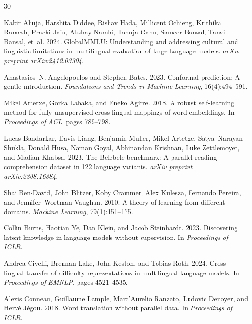 \documentclass[11pt,a4paper]{article}
\begin{document}
\begin{thebibliography}{30}

Kabir Ahuja, Harshita Diddee, Rishav Hada, Millicent Ochieng, Krithika Ramesh, Prachi Jain, Akshay Nambi, Tanuja Ganu, Sameer Bansal, Tanvi Bansal, et~al. 2024.
\newblock Global{MMLU}: Understanding and addressing cultural and linguistic limitations in multilingual evaluation of large language models.
\newblock \emph{arXiv preprint arXiv:2412.03304}.

Anastasios~N. Angelopoulos and Stephen Bates. 2023.
\newblock Conformal prediction: A gentle introduction.
\newblock \emph{Foundations and Trends in Machine Learning}, 16(4):494--591.

Mikel Artetxe, Gorka Labaka, and Eneko Agirre. 2018.
\newblock A robust self-learning method for fully unsupervised cross-lingual mappings of word embeddings.
\newblock In \emph{Proceedings of ACL}, pages 789--798.

Lucas Bandarkar, Davis Liang, Benjamin Muller, Mikel Artetxe, Satya~Narayan Shukla, Donald Husa, Naman Goyal, Abhinandan Krishnan, Luke Zettlemoyer, and Madian Khabsa. 2023.
\newblock The {B}elebele benchmark: A parallel reading comprehension dataset in 122 language variants.
\newblock \emph{arXiv preprint arXiv:2308.16884}.

Shai Ben-David, John Blitzer, Koby Crammer, Alex Kulesza, Fernando Pereira, and Jennifer~Wortman Vaughan. 2010.
\newblock A theory of learning from different domains.
\newblock \emph{Machine Learning}, 79(1):151--175.

Collin Burns, Haotian Ye, Dan Klein, and Jacob Steinhardt. 2023.
\newblock Discovering latent knowledge in language models without supervision.
\newblock In \emph{Proceedings of ICLR}.

Andrea Civelli, Brennan Lake, John Keston, and Tobias Roth. 2024.
\newblock Cross-lingual transfer of difficulty representations in multilingual language models.
\newblock In \emph{Proceedings of EMNLP}, pages 4521--4535.

Alexis Conneau, Guillaume Lample, Marc'Aurelio Ranzato, Ludovic Denoyer, and Herv{\'e} J{\'e}gou. 2018.
\newblock Word translation without parallel data.
\newblock In \emph{Proceedings of ICLR}.


\end{thebibliography}
\end{document}

